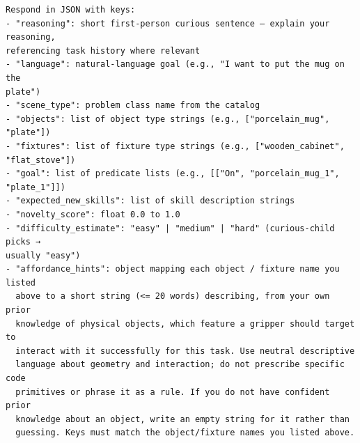 \begin{lstlisting}[style=ratsappendixprompt]
Respond in JSON with keys:
- "reasoning": short first-person curious sentence — explain your reasoning,
referencing task history where relevant
- "language": natural-language goal (e.g., "I want to put the mug on the
plate")
- "scene_type": problem class name from the catalog
- "objects": list of object type strings (e.g., ["porcelain_mug", "plate"])
- "fixtures": list of fixture type strings (e.g., ["wooden_cabinet",
"flat_stove"])
- "goal": list of predicate lists (e.g., [["On", "porcelain_mug_1",
"plate_1"]])
- "expected_new_skills": list of skill description strings
- "novelty_score": float 0.0 to 1.0
- "difficulty_estimate": "easy" | "medium" | "hard" (curious-child picks →
usually "easy")
- "affordance_hints": object mapping each object / fixture name you listed
  above to a short string (<= 20 words) describing, from your own prior
  knowledge of physical objects, which feature a gripper should target to
  interact with it successfully for this task. Use neutral descriptive
  language about geometry and interaction; do not prescribe specific code
  primitives or phrase it as a rule. If you do not have confident prior
  knowledge about an object, write an empty string for it rather than
  guessing. Keys must match the object/fixture names you listed above.
\end{lstlisting}

